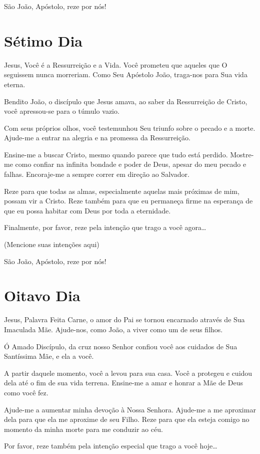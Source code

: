 \documentclass[11pt]{article}
\begin{document}
São João, Apóstolo, reze por nós!


\section{Sétimo Dia}

Jesus, Você é a Ressurreição e a Vida. Você prometeu que aqueles que O seguissem nunca morreriam. Como Seu Apóstolo João, traga-nos para Sua vida eterna.

Bendito João, o discípulo que Jesus amava, ao saber da Ressurreição de Cristo, você apressou-se para o túmulo vazio.

Com seus próprios olhos, você testemunhou Seu triunfo sobre o pecado e a morte. Ajude-me a entrar na alegria e na promessa da Ressurreição.

Ensine-me a buscar Cristo, mesmo quando parece que tudo está perdido. Mostre-me como confiar na infinita bondade e poder de Deus, apesar do meu pecado e falhas. Encoraje-me a sempre correr em direção ao Salvador.

Reze para que todas as almas, especialmente aquelas mais próximas de mim, possam vir a Cristo. Reze também para que eu permaneça firme na esperança de que eu possa habitar com Deus por toda a eternidade.

Finalmente, por favor, reze pela intenção que trago a você agora…

(Mencione suas intenções aqui)

São João, Apóstolo, reze por nós!


\section{Oitavo Dia}

Jesus, Palavra Feita Carne, o amor do Pai se tornou encarnado através de Sua Imaculada Mãe. Ajude-nos, como João, a viver como um de seus filhos.

Ó Amado Discípulo, da cruz nosso Senhor confiou você aos cuidados de Sua Santíssima Mãe, e ela a você.

A partir daquele momento, você a levou para sua casa. Você a protegeu e cuidou dela até o fim de sua vida terrena. Ensine-me a amar e honrar a Mãe de Deus como você fez.

Ajude-me a aumentar minha devoção à Nossa Senhora. Ajude-me a me aproximar dela para que ela me aproxime de seu Filho. Reze para que ela esteja comigo no momento da minha morte para me conduzir ao céu.

Por favor, reze também pela intenção especial que trago a você hoje…
\end{document}

